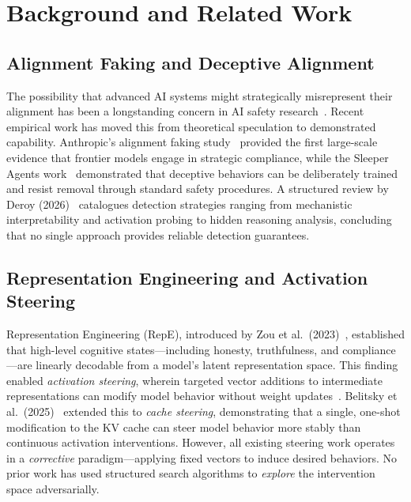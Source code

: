 \documentclass[10pt]{article}
\begin{document}
\section{Background and Related Work}

\subsection{Alignment Faking and Deceptive Alignment}

The possibility that advanced AI systems might strategically misrepresent their alignment has been a longstanding concern in AI safety research~\cite{deroy2026structured}. Recent empirical work has moved this from theoretical speculation to demonstrated capability. Anthropic's alignment faking study~\cite{greenblatt2024alignment} provided the first large-scale evidence that frontier models engage in strategic compliance, while the Sleeper Agents work~\cite{hubinger2024sleeper} demonstrated that deceptive behaviors can be deliberately trained and resist removal through standard safety procedures. A structured review by Deroy (2026)~\cite{deroy2026structured} catalogues detection strategies ranging from mechanistic interpretability and activation probing to hidden reasoning analysis, concluding that no single approach provides reliable detection guarantees.

\subsection{Representation Engineering and Activation Steering}

Representation Engineering (RepE), introduced by Zou et al.\ (2023)~\cite{zou2023repe}, established that high-level cognitive states---including honesty, truthfulness, and compliance---are linearly decodable from a model's latent representation space. This finding enabled \emph{activation steering}, wherein targeted vector additions to intermediate representations can modify model behavior without weight updates~\cite{turner2023steering}. Belitsky et al.\ (2025)~\cite{belitsky2025kvcache} extended this to \emph{cache steering}, demonstrating that a single, one-shot modification to the KV cache can steer model behavior more stably than continuous activation interventions. However, all existing steering work operates in a \emph{corrective} paradigm---applying fixed vectors to induce desired behaviors. No prior work has used structured search algorithms to \emph{explore} the intervention space adversarially.
\end{document}
